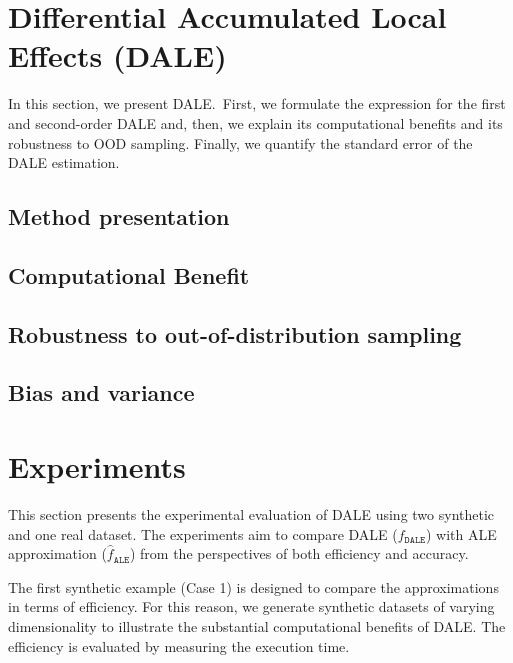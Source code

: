 \documentclass[wcp]{jmlr}
\begin{document}
\section{Differential Accumulated Local Effects (DALE)}

In this section, we present DALE.~First, we formulate the expression
for the first and second-order DALE and, then, we explain its
computational benefits and its robustness to OOD sampling. Finally, we
quantify the standard error of the DALE estimation.

\subsection{Method presentation}
\label{sec:4-1-DALE}


\subsection{Computational Benefit}
\label{sec:4-2-computational}


\subsection{Robustness to out-of-distribution sampling}
\label{sec:4-3-robustness}


\subsection{Bias and variance}
\label{sec:4-4-std}


% 

\section{Experiments}

This section presents the experimental evaluation of DALE using two
synthetic and one real dataset. The experiments aim to compare DALE
(\(f_{\mathtt{DALE}}\)) with ALE approximation
(\(\hat{f}_{\mathtt{ALE}}\)) from the perspectives of both efficiency
and accuracy.

The first synthetic example (Case 1) is designed to compare the
approximations in terms of efficiency. For this reason, we generate
synthetic datasets of varying dimensionality to illustrate the
substantial computational benefits of DALE. The efficiency is
evaluated by measuring the execution time.
\end{document}
